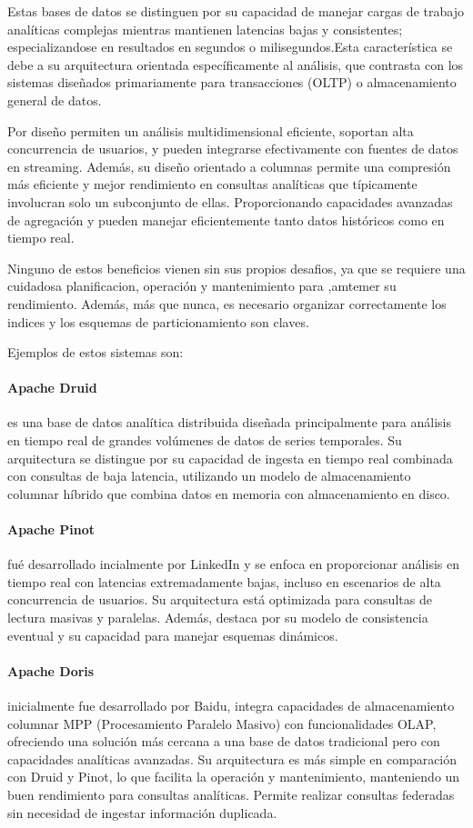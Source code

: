 Estas bases de datos se distinguen por su capacidad de manejar cargas de trabajo analíticas complejas mientras mantienen latencias bajas y consistentes; 
especializandose en resultados en segundos o milisegundos.Esta característica se debe a su arquitectura orientada específicamente al análisis, 
que contrasta con los sistemas diseñados primariamente para transacciones (OLTP) o almacenamiento general de datos.

Por diseño permiten un análisis multidimensional eficiente, soportan alta concurrencia de usuarios, y pueden integrarse efectivamente con fuentes de datos en streaming.
Además, su diseño orientado a columnas permite una compresión más eficiente y mejor rendimiento en consultas analíticas que típicamente involucran solo un subconjunto de ellas. 
Proporcionando capacidades avanzadas de agregación y pueden manejar eficientemente tanto datos históricos como en tiempo real.

Ninguno de estos beneficios vienen sin sus propios desafios, ya que se requiere una cuidadosa planificacion, operación y mantenimiento para ,amtemer su rendimiento.
Además, más que nunca, es necesario organizar correctamente los indices y los esquemas de particionamiento son claves.

Ejemplos de estos sistemas son:

\paragraph{Apache Druid}
es una base de datos analítica distribuida diseñada principalmente para análisis en tiempo real de grandes volúmenes de datos de series temporales. 
Su arquitectura se distingue por su capacidad de ingesta en tiempo real combinada con consultas de baja latencia, 
utilizando un modelo de almacenamiento columnar híbrido que combina datos en memoria con almacenamiento en disco. 

\paragraph{Apache Pinot} 
fué desarrollado incialmente por LinkedIn y se enfoca en proporcionar análisis en tiempo real con latencias extremadamente bajas, 
incluso en escenarios de alta concurrencia de usuarios. 
Su arquitectura está optimizada para consultas de lectura masivas y paralelas. 
Además, destaca por su modelo de consistencia eventual y su capacidad para manejar esquemas dinámicos.

\paragraph{Apache Doris} 
inicialmente fue desarrollado por Baidu, integra capacidades de almacenamiento columnar MPP (Procesamiento Paralelo Masivo) con funcionalidades OLAP, 
ofreciendo una solución más cercana a una base de datos tradicional pero con capacidades analíticas avanzadas. 
Su arquitectura es más simple en comparación con Druid y Pinot, lo que facilita la operación y mantenimiento, manteniendo un buen rendimiento para consultas analíticas.
Permite realizar consultas federadas sin necesidad de ingestar información duplicada.

